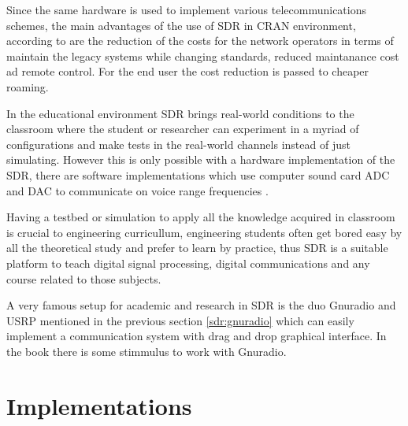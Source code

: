 Since the same hardware is used to implement various telecommunications schemes,
the main advantages of the use of SDR in CRAN environment, according to
\cite{dayananda2012} are the reduction of the costs for the network operators in
terms of maintain the legacy systems while changing standards, reduced
maintanance cost ad remote control. For the end user the cost reduction is
passed to cheaper roaming.




In the educational environment SDR brings real-world conditions to the classroom
where the student or researcher can experiment in a myriad of configurations and
make tests in the real-world channels instead of just simulating. However this
is only possible with a hardware implementation of the SDR, there are software
implementations which use computer sound card ADC and DAC to communicate on
voice range frequencies \cite{ladimer2009}.

Having a testbed or simulation to apply all the knowledge acquired in classroom
is crucial to engineering curricullum, engineering students often get bored easy
by all the theoretical study and prefer to learn by practice, thus SDR is a
suitable platform to teach digital signal processing, digital communications and
any course related to those subjects.

A very famous setup for academic and research in SDR is the duo Gnuradio
\cite{web:gnuradio} and USRP \cite{web:usrp} mentioned in the previous section
\ref{sdr:gnuradio} which can easily implement a communication system with drag
and drop graphical interface. In the book \cite{akbook} there is some stimmulus
to work with Gnuradio.


\section{Implementations}
\label{sdr:implement}

